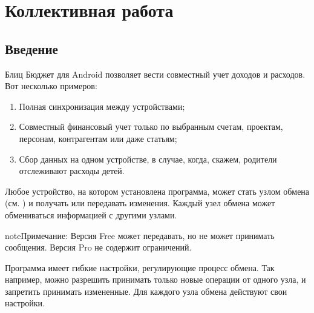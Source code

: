 \documentclass[a4paper,10pt,russian]{sphinxmanual}
\begin{document}
\noindent{}

\noindent{}


\chapter{Коллективная работа}
\label{\detokenize{teamwork:chapter-teamwork}}\label{\detokenize{teamwork:id1}}\label{\detokenize{teamwork::doc}}

\section{Введение}
\label{\detokenize{teamwork:id2}}
Блиц Бюджет для Android позволяет вести совместный учет доходов и расходов. Вот несколько примеров:
\begin{enumerate}
\def\theenumi{\arabic{enumi}}
\def\labelenumi{\theenumi .}
\makeatletter\def\p@enumii{\p@enumi \theenumi .}\makeatother
\item {} 
Полная синхронизация между устройствами;

\item {} 
Совместный финансовый учет только по выбранным счетам, проектам, персонам, контрагентам или даже статьям;

\item {} 
Сбор данных на одном устройстве, в случае, когда, скажем, родители отслеживают расходы детей.

\end{enumerate}

Любое устройство, на котором установлена программа, может стать узлом обмена (см. {\hyperref[\detokenize{glossary:term-1}]{}}) и получать или передавать изменения. Каждый узел обмена может обмениваться информацией с другими узлами.

\begin{sphinxadmonition}{note}{Примечание:}
Версия Free может передавать, но не может принимать сообщения. Версия Pro не содержит ограничений.
\end{sphinxadmonition}

Программа имеет гибкие настройки, регулирующие процесс обмена. Так например, можно разрешить принимать только новые операции от одного узла, и запретить принимать измененные. Для каждого узла обмена действуют свои настройки.
\end{document}
